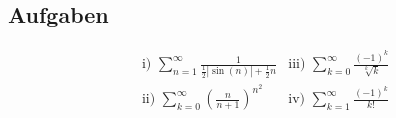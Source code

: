 \documentclass[a4paper,12pt]{article}
\begin{document}
	\subsection{Aufgaben}
		\begin{align*}
			&\text{i) } \sum_{n=1}^{\infty} \frac{1}{\frac{1}{2} \left|\sin\left(n\right)\right| + \frac{1}{2}n} &\text{iii) } \sum_{k=0}^{\infty} \frac{\left(-1\right)^k}{\sqrt[k]{k}}\\
			&\text{ii) } \sum_{k=0}^{\infty} \left(\frac{n}{n+1}\right)^{n^2} &\text{iv) } \sum_{k=1}^{\infty} \frac{\left(-1\right)^k}{k!}
		\end{align*}
\end{document}
